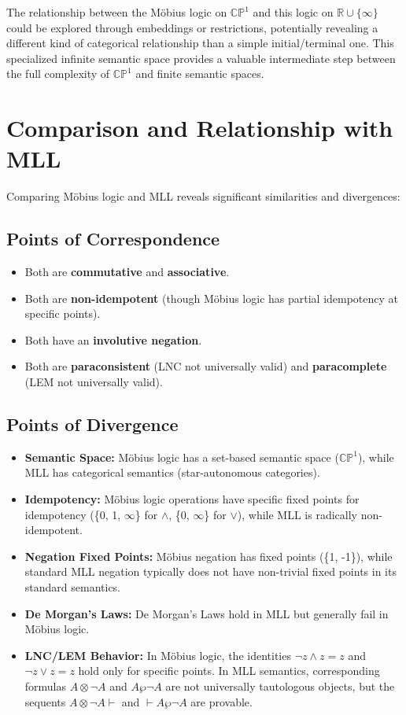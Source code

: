 	The relationship between the M\"{o}bius logic on $\mathbb{CP}^1$ and this logic on $\mathbb{R} \cup \{\infty\}$ could be explored through embeddings or restrictions, potentially revealing a different kind of categorical relationship than a simple initial/terminal one. This specialized infinite semantic space provides a valuable intermediate step between the full complexity of $\mathbb{CP}^1$ and finite semantic spaces.
	
	\section{Comparison and Relationship with MLL}
	
	Comparing M\"{o}bius logic and MLL reveals significant similarities and divergences:
	
	\subsection{Points of Correspondence}
	\begin{itemize}
		\item Both are \textbf{commutative} and \textbf{associative}.
		\item Both are \textbf{non-idempotent} (though M\"{o}bius logic has partial idempotency at specific points).
		\item Both have an \textbf{involutive negation}.
		\item Both are \textbf{paraconsistent} (LNC not universally valid) and \textbf{paracomplete} (LEM not universally valid).
	\end{itemize}
	
	\subsection{Points of Divergence}
	\begin{itemize}
		\item \textbf{Semantic Space:} M\"{o}bius logic has a set-based semantic space (\(\mathbb{CP}^1\)), while MLL has categorical semantics (star-autonomous categories).
		\item \textbf{Idempotency:} M\"{o}bius logic operations have specific fixed points for idempotency (\{0, 1, \(\infty\)\} for \(\wedge\), \{0, \(\infty\)\} for \(\vee\)), while MLL is radically non-idempotent.
		\item \textbf{Negation Fixed Points:} M\"{o}bius negation has fixed points (\{1, -1\}), while standard MLL negation typically does not have non-trivial fixed points in its standard semantics.
		\item \textbf{De Morgan's Laws:} De Morgan's Laws hold in MLL but generally fail in M\"{o}bius logic.
		\item \textbf{LNC/LEM Behavior:} In M\"{o}bius logic, the identities \(\neg z \wedge z = z\) and \(\neg z \vee z = z\) hold only for specific points. In MLL semantics, corresponding formulas \(A \otimes \neg A\) and \(A \wp \neg A\) are not universally tautologous objects, but the sequents $A \otimes \neg A \vdash$ and $\vdash A \wp \neg A$ are provable.
	\end{itemize}
	
